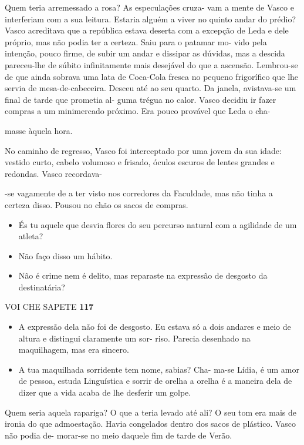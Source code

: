 Quem teria arremessado a rosa? As especulações cruza- vam a mente de
Vasco e interferiam com a sua leitura. Estaria alguém a viver no quinto
andar do prédio? Vasco acreditava que a república estava deserta com a
excepção de Leda e dele próprio, mas não podia ter a certeza. Saiu para
o patamar mo- vido pela intenção, pouco firme, de subir um andar e
dissipar as dúvidas, mas a descida pareceu-lhe de súbito infinitamente
mais desejável do que a ascensão. Lembrou-se de que ainda sobrava uma
lata de Coca-Cola fresca no pequeno frigorífico que lhe servia de
mesa-de-cabeceira. Desceu até ao seu quarto. Da janela, avistava-se um
final de tarde que prometia al- guma trégua no calor. Vasco decidiu ir
fazer compras a um minimercado próximo. Era pouco provável que Leda o
cha-

masse àquela hora.

No caminho de regresso, Vasco foi interceptado por uma jovem da sua
idade: vestido curto, cabelo volumoso e frisado, óculos escuros de
lentes grandes e redondas. Vasco recordava-

-se vagamente de a ter visto nos corredores da Faculdade, mas não tinha
a certeza disso. Pousou no chão os sacos de compras.

\begin{itemize}
\tightlist
\item
  És tu aquele que desvia flores do seu percurso natural com a agilidade
  de um atleta?
\item
  Não faço disso um hábito.
\item
  Não é crime nem é delito, mas reparaste na expressão de desgosto da
  destinatária?
\end{itemize}

VOI CHE SAPETE \textbf{117}

\begin{itemize}
\tightlist
\item
  A expressão dela não foi de desgosto. Eu estava só a dois andares e
  meio de altura e distingui claramente um sor- riso. Parecia desenhado
  na maquilhagem, mas era sincero.
\item
  A tua maquilhada sorridente tem nome, sabias? Cha- ma-se Lídia, é um
  amor de pessoa, estuda Linguística e sorrir de orelha a orelha é a
  maneira dela de dizer que a vida acaba de lhe desferir um golpe.
\end{itemize}

Quem seria aquela rapariga? O que a teria levado até ali? O seu tom era
mais de ironia do que admoestação. Havia congelados dentro dos sacos de
plástico. Vasco não podia de- morar-se no meio daquele fim de tarde de
Verão.

